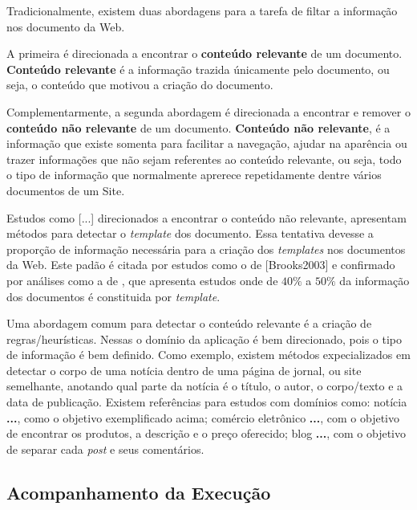 \documentclass{acm_proc_article-sp}
\newcommand{\remove}[1]{}
\numberwithin{equation}{section}
\begin{document}
Tradicionalmente, existem duas abordagens para a tarefa de filtar a informação nos 
	documento da Web. 
  \remove{, diminuindo a quantidade de dados não informativos processados.}
A primeira é direcionada a encontrar o {\bf conteúdo relevante} de um 
	documento. {\bf Conteúdo relevante} é a informação trazida únicamente pelo 
	documento, ou seja,
		o conteúdo que motivou a criação do documento.

Complementarmente, a segunda abordagem é direcionada a encontrar e remover o 
	{\bf conteúdo não relevante} de um documento. {\bf Conteúdo não relevante},
	é a informação que existe somenta para facilitar a navegação,
	ajudar na aparência ou trazer informações que não sejam referentes ao 
	conteúdo relevante, ou seja,
		todo o tipo de informação que normalmente aprerece repetidamente 
		dentre vários documentos de um Site.


Estudos como [...] direcionados a encontrar o conteúdo não relevante,
apresentam métodos para detectar o {\it template} dos documento.
	Essa tentativa devesse a proporção de informação necessária para a criação
	dos {\it templates} nos documentos da Web. Este padão é 
	citada por estudos como o de [Brooks2003] e confirmado por análises 
	como a de \cite{Gibson2005}, que apresenta estudos onde de $40\%$ a $50\%$ da 
  informação dos documentos é constituida por {\it template}.


Uma abordagem comum para detectar o conteúdo relevante é a criação de
regras/heurísticas. 
	Nessas 
		o domínio da aplicação é bem direcionado, pois o tipo de informação é 
		bem definido.
		Como exemplo,
			existem métodos expecializados em detectar o corpo de uma notícia 
			dentro de uma página de jornal, ou site semelhante,
			anotando qual parte da notícia é 
				o título,
				o autor, o corpo/texto e
				a data de publicação.
			Existem referências para estudos com domínios como:
				notícia {\bf \cite{}...}, como o objetivo exemplificado acima;
				comércio eletrônico {\bf \cite{}...}, com o objetivo de 
				encontrar os produtos, a descrição e o preço oferecido;
				blog {\bf \cite{}...}, com o objetivo de separar cada 
				{\it post} e seus comentários.


\remove{
Embora estudos como \cite{}... apresentem resutados "interessantes" na detecção de templates, 
}


\subsection{Acompanhamento da Execução}
\end{document}
